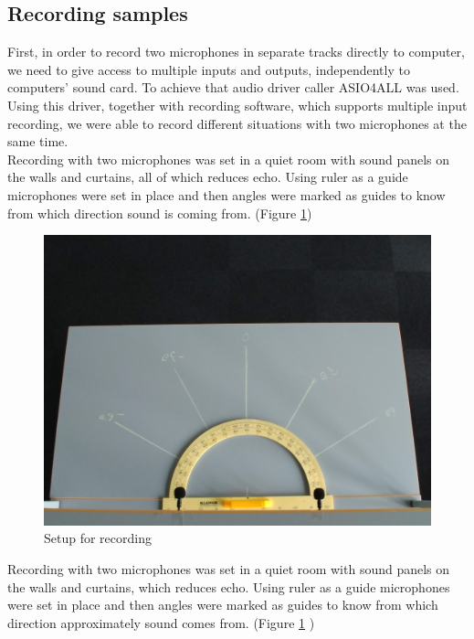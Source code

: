 \subsection{Recording samples}
First, in order to record two microphones in separate tracks directly to computer, we need to give access to multiple inputs and outputs,  
independently to computers' sound card. To achieve that audio driver caller ASIO4ALL was used. Using this driver, together with recording software, 
which supports multiple input recording, we were able to record different situations with two microphones at the same time. \\
Recording with two microphones was set in a quiet room with sound panels on the walls and curtains, all of 
which reduces echo. Using ruler as a guide microphones were set in place and then angles were marked as 
guides to know from which direction sound is coming from. (Figure \ref{fig:recSetup}) 
\begin{figure}[htp]
	\centering
	\includegraphics[width=1\textwidth]{Illustrations/JustSetup.jpg}
	\caption{Setup for recording}
	\label{fig:recSetup}
\end{figure}

Recording with two microphones was set in a quiet room with sound panels on the walls and curtains, which reduces echo. Using ruler as a guide microphones were set in place and then angles were marked as guides to know from which direction approximately sound comes from. (Figure \ref{fig:recSetup} ) 



